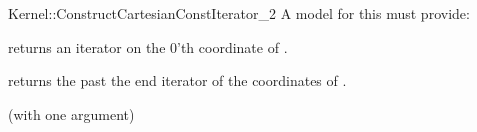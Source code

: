 \begin{ccRefFunctionObjectConcept}{Kernel::ConstructCartesianConstIterator_2}
A model for this must provide:



 {returns an iterator on the 0'th   coordinate of .}

 {returns the past the end iterator of the   coordinates of .}




\ccRefines
{} (with one argument)

\ccSeeAlso
{} \\

\end{ccRefFunctionObjectConcept}
